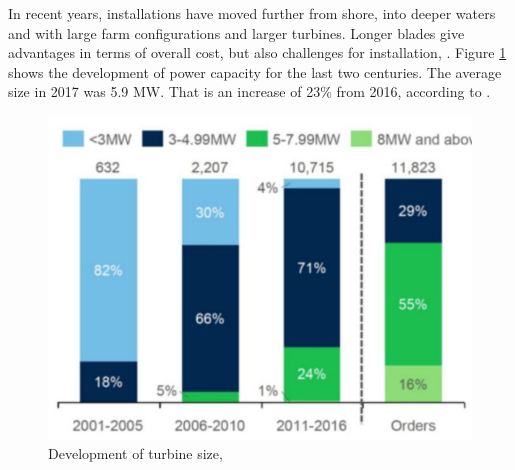 \noindent In recent years, installations have moved further from shore, into deeper waters and with large farm configurations and larger turbines.  Longer blades give advantages in terms of overall cost, but also challenges for installation, \cite{Gao2018}.  Figure \ref{fig:diameter} shows the development of power capacity for the last two centuries. The average size in 2017 was 5.9 MW. That is an increase of 23\% from 2016, according to \cite{we2018}.

\begin{figure}[H]
\centering
\includegraphics[scale=0.7]{figures/diameter}
\caption[$\; \:$Development of turbine size]{Development of turbine size, \cite{Deigen2018}}
 \label{fig:diameter}
\end{figure}

